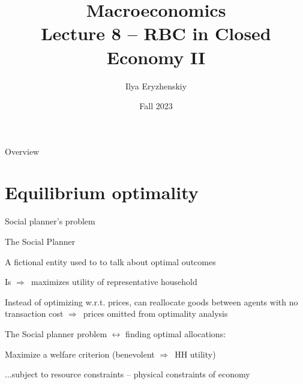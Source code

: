 \documentclass{beamer}
\title[PSME]{Macroeconomics\\ Lecture 8 -- RBC in Closed Economy II}
\author[I. Eryzhenskiy]{Ilya Eryzhenskiy}
\institute[BdF]{PSME Panth\'{e}on-Sorbonne Master in Economics}
\date[PSME macro]{Fall 2023}
\newcommand{\tb}[1]{{\color{blue}{\textbf{#1}}}}
\newenvironment{mytemize}
{\vfill\itemize[nolistsep,itemsep=\fill,label=\color{blue}{$\triangleright$}]}
  {\enditemize}
\newcommand{\rarr}{$\Rightarrow$\ }
\begin{document}
\begin{frame}
  \maketitle
\end{frame}

\begin{frame}{Overview}
  \tableofcontents
\end{frame}

\section{Equilibrium optimality}
\begin{frame}{Social planner's problem}

\begin{mytemize}
\item The Social Planner
\begin{mytemize}
\item A fictional entity used to  to talk about optimal outcomes
\item Is \tb{benevolent} \rarr maximizes utility of representative household
\item Instead of optimizing w.r.t. prices, can reallocate goods between agents with no transaction cost 
  \rarr prices omitted from optimality analysis
\end{mytemize}
\item  The Social planner problem $\leftrightarrow$ finding optimal allocations:
\begin{mytemize}
\item Maximize a welfare criterion (benevolent \rarr HH utility)
\item ...subject to resource constraints -- physical constraints of economy
\end{mytemize}
\end{mytemize}


\end{frame}
\end{document}
